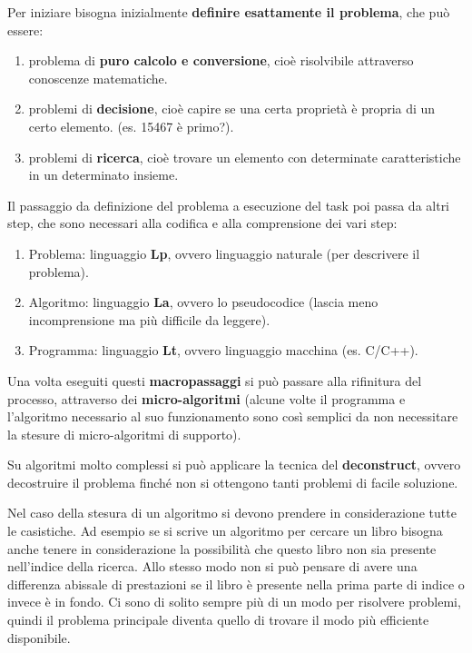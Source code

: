 \documentclass[
  paper=a4,
  oneside  ,captions=tableheading
]{scrbook}
\providecommand{\tightlist}{%
  \setlength{\itemsep}{0pt}\setlength{\parskip}{0pt}}
\begin{document}
Per iniziare bisogna inizialmente \textbf{definire esattamente il
problema}, che può essere:

\begin{enumerate}
\def\labelenumi{\arabic{enumi}.}
\tightlist
\item
  problema di \textbf{puro calcolo e conversione}, cioè risolvibile
  attraverso conoscenze matematiche.
\item
  problemi di \textbf{decisione}, cioè capire se una certa proprietà è
  propria di un certo elemento. (es. 15467 è primo?).
\item
  problemi di \textbf{ricerca}, cioè trovare un elemento con determinate
  caratteristiche in un determinato insieme.
\end{enumerate}

Il passaggio da definizione del problema a esecuzione del task poi passa
da altri step, che sono necessari alla codifica e alla comprensione dei
vari step:

\begin{enumerate}
\def\labelenumi{\arabic{enumi}.}
\tightlist
\item
  Problema: linguaggio \textbf{Lp}, ovvero linguaggio naturale (per
  descrivere il problema).
\item
  Algoritmo: linguaggio \textbf{La}, ovvero lo pseudocodice (lascia meno
  incomprensione ma più difficile da leggere).
\item
  Programma: linguaggio \textbf{Lt}, ovvero linguaggio macchina (es.
  C/C++).
\end{enumerate}

Una volta eseguiti questi \textbf{macropassaggi} si può passare alla
rifinitura del processo, attraverso dei \textbf{micro-algoritmi} (alcune
volte il programma e l'algoritmo necessario al suo funzionamento sono
così semplici da non necessitare la stesure di micro-algoritmi di
supporto).

Su algoritmi molto complessi si può applicare la tecnica del
\textbf{deconstruct}, ovvero decostruire il problema finché non si
ottengono tanti problemi di facile soluzione.

Nel caso della stesura di un algoritmo si devono prendere in
considerazione tutte le casistiche. Ad esempio se si scrive un algoritmo
per cercare un libro bisogna anche tenere in considerazione la
possibilità che questo libro non sia presente nell'indice della ricerca.
Allo stesso modo non si può pensare di avere una differenza abissale di
prestazioni se il libro è presente nella prima parte di indice o invece
è in fondo. Ci sono di solito sempre più di un modo per risolvere
problemi, quindi il problema principale diventa quello di trovare il
modo più efficiente disponibile.
\end{document}
